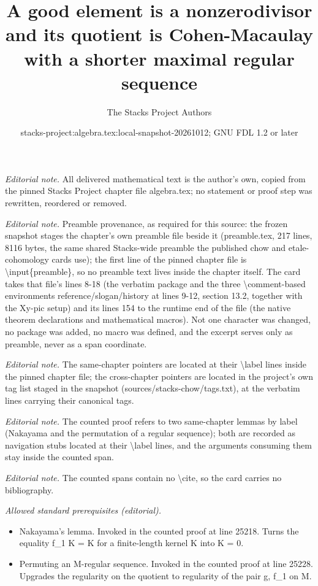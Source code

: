 \documentclass[10pt,a4paper]{amsart}
\title{A good element is a nonzerodivisor and its quotient is Cohen-Macaulay with a shorter maximal regular sequence}
\author{The Stacks Project Authors}
\date{stacks-project:algebra.tex:local-snapshot-20261012; GNU FDL 1.2 or later}
\theoremstyle{plain}
\theoremstyle{definition}
\theoremstyle{remark}
\numberwithin{equation}{subsection}
\begin{document}
\maketitle
\noindent\textit{Editorial note.} All delivered mathematical text is the author's own, copied from the pinned Stacks Project chapter file algebra.tex; no statement or proof step was rewritten, reordered or removed.\par\medskip
\noindent\textit{Editorial note.} Preamble provenance, as required for this source: the frozen snapshot stages the chapter's own preamble file beside it (preamble.tex, 217 lines, 8116 bytes, the same shared Stacks-wide preamble the published chow and etale-cohomology cards use); the first line of the pinned chapter file is \textbackslash{}input\{preamble\}, so no preamble text lives inside the chapter itself. The card takes that file's lines 8-18 (the verbatim package and the three \textbackslash{}comment-based environments reference/slogan/history at lines 9-12, section 13.2, together with the Xy-pic setup) and its lines 154 to the runtime end of the file (the native theorem declarations and mathematical macros). Not one character was changed, no package was added, no macro was defined, and the excerpt serves only as preamble, never as a span coordinate.\par\medskip
\noindent\textit{Editorial note.} The same-chapter pointers are located at their \textbackslash{}label lines inside the pinned chapter file; the cross-chapter pointers are located in the project's own tag list staged in the snapshot (sources/stacks-chow/tags.txt), at the verbatim lines carrying their canonical tags.\par\medskip
\noindent\textit{Editorial note.} The counted proof refers to two same-chapter lemmas by label (Nakayama and the permutation of a regular sequence); both are recorded as navigation stubs located at their \textbackslash{}label lines, and the arguments consuming them stay inside the counted span.\par\medskip
\noindent\textit{Editorial note.} The counted spans contain no \textbackslash{}cite, so the card carries no bibliography.\par\medskip
\noindent\textit{Allowed standard prerequisites (editorial).}\begin{itemize}
\item Nakayama's lemma. Invoked in the counted proof at line 25218. Turns the equality f\_1 K = K for a finite-length kernel K into K = 0.
\item Permuting an M-regular sequence. Invoked in the counted proof at line 25228. Upgrades the regularity on the quotient to regularity of the pair g, f\_1 on M.
\end{itemize}\medskip
\end{document}
